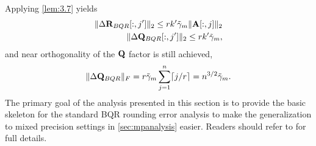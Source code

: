 Applying \cref{lem:3.7} yields 
\begin{align}
\|\Delta \mathbf{R}_{BQR}[:,j']\|_2 \leq rk'\tilde{\gamma}_{m} \|\mathbf{A}[:,j]\|_2 \\
\|\Delta \mathbf{Q}_{BQR}[:,j']\|_2 \leq rk'\tilde{\gamma}_{m},
\end{align}
and near orthogonality of the $\mathbf{Q}$ factor is still achieved,
\begin{equation}
	\|\Delta \mathbf{Q}_{BQR}\|_F = r\tilde{\gamma}_{m}\sum_{j=1}^n \lceil j/r\rceil = n^{3/2}\tilde{\gamma}_{m}.
\end{equation}
The primary goal of the analysis presented in this section is to provide the basic skeleton for the standard BQR rounding error analysis to make the generalization to mixed precision settings in \cref{sec:mpanalysis} easier.
Readers should refer to \cite{golub2013matrix,Higham2002} for full details.